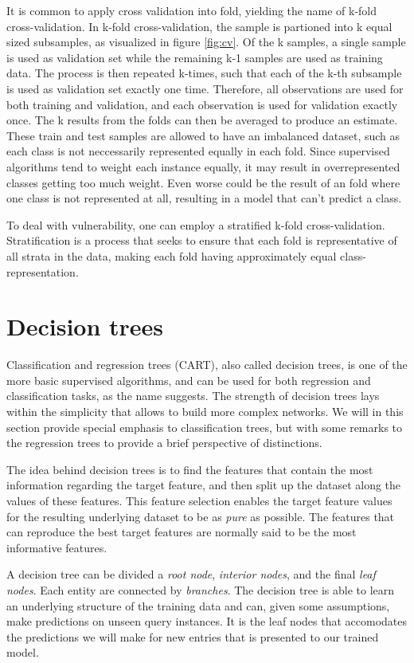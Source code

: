 It is common to apply cross validation into fold, yielding the name of k-fold cross-validation. In k-fold cross-validation, the sample is partioned into k equal sized subsamples, as visualized in figure \ref{fig:cv}. Of the k samples, a single sample is used as validation set while the remaining k-1 samples are used as training data. The process is then repeated k-times, such that each of the k-th subsample is used as validation set exactly one time. Therefore, all observations are used for both training and validation, and each observation is used for validation exactly once. The k results from the folds can then be averaged to produce an estimate. These train and test samples are allowed to have an imbalanced dataset, such as each class is not neccessarily represented equally in each fold. Since supervised algorithms tend to weight each instance equally, it may result in overrepresented classes getting too much weight. Even worse could be the result of an fold where one class is not represented at all, resulting in a model that can't predict a class.


To deal with vulnerability, one can employ a stratified k-fold cross-validation. Stratification is a process that seeks to ensure that each fold is representative of all strata in the data, making each fold having approximately equal class-representation.

\section{Decision trees}
Classification and regression trees (CART), also called decision trees, is one of the more basic supervised algorithms, and can be used for both regression and classification tasks, as the name suggests. The strength of decision trees lays within the simplicity that allows to build more complex networks. We will in this section provide special emphasis to classification trees, but with some remarks to the regression trees to provide a brief perspective of distinctions.

The idea behind decision trees is to find the features that contain the most information regarding the target feature, and then split up the dataset along the values of these features. This feature selection enables the target feature values for the resulting underlying dataset to be as \textit{pure} as possible. The features that can reproduce the best target features are normally said to be the most informative features.

A decision tree can be divided a \textit{root node}, \textit{interior nodes}, and the final \textit{leaf nodes}. Each entity are connected by \textit{branches}. The decision tree is able to learn an underlying structure of the training data and can, given some assumptions, make predictions on unseen query instances. It is the leaf nodes that accomodates the predictions we will make for new entries that is presented to our trained model.

